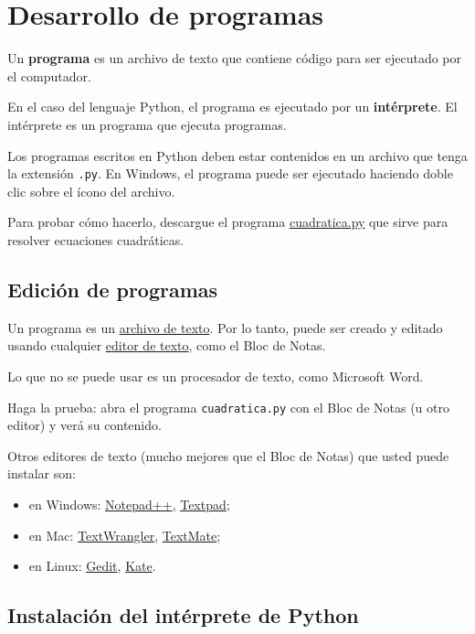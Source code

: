 \section{Desarrollo de programas}

Un \textbf{programa} es un archivo de texto que contiene código para ser
ejecutado por el computador.

En el caso del lenguaje Python, el programa es ejecutado por un
\textbf{intérprete}. El intérprete es un programa que ejecuta programas.

Los programas escritos en Python deben estar contenidos en un archivo
que tenga la extensión \lstinline!.py!. En Windows, el programa puede
ser ejecutado haciendo doble clic sobre el ícono del archivo.

Para probar cómo hacerlo, descargue el programa
\href{../\_static/programas/cuadratica.py}{cuadratica.py} que sirve para
resolver ecuaciones cuadráticas.

\subsection{Edición de programas}

Un programa es un
\href{http://es.wikipedia.org/wiki/Archivo\_de\_texto}{archivo de
texto}. Por lo tanto, puede ser creado y editado usando cualquier
\href{http://es.wikipedia.org/wiki/Editor\_de\_texto}{editor de texto},
como el Bloc de Notas.

Lo que no se puede usar es un procesador de texto, como Microsoft Word.

Haga la prueba: abra el programa \lstinline!cuadratica.py! con el Bloc
de Notas (u otro editor) y verá su contenido.

Otros editores de texto (mucho mejores que el Bloc de Notas) que usted
puede instalar son:

\begin{itemize}
\item
  en Windows: \href{http://notepad-plus-plus.org/}{Notepad++},
  \href{http://www.textpad.com/}{Textpad};
\item
  en Mac:
  \href{http://www.barebones.com/products/textwrangler/}{TextWrangler},
  \href{http://macromates.com/}{TextMate};
\item
  en Linux: \href{http://projects.gnome.org/gedit/}{Gedit},
  \href{http://kate-editor.org/}{Kate}.
\end{itemize}

\subsection{Instalación del intérprete de Python}

